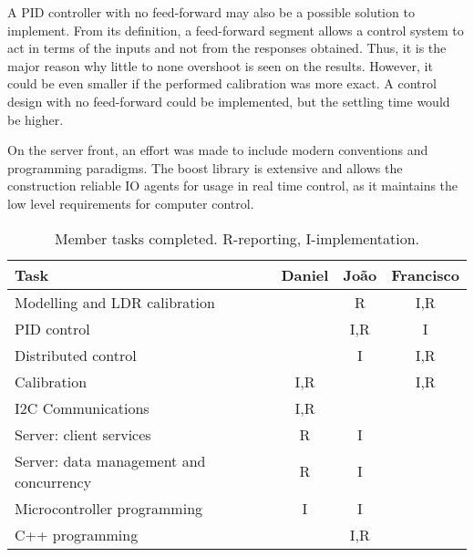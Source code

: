 \documentclass[english,fira]{ist-report}
\begin{document}

A PID controller with no feed-forward may also be a possible solution to implement. From its definition, a feed-forward segment allows a control system to act in terms of the inputs and not from the responses obtained. Thus, it is the major reason why little to none overshoot is seen on the results. However, it could be even smaller if the performed calibration was more exact. A control design with no feed-forward could be implemented, but the settling time would be higher.

On the server front, an effort was made to include modern conventions and programming paradigms. The boost library is extensive and allows the construction reliable IO agents for usage in real time control, as it maintains the low level requirements for computer control. 

\nocite{consensusbernardino}
\printbibliography[heading = bibnumbered]

\begin{table}[H]
    \centering
    \begin{tabular}{l|c|c|c}
        \toprule
        \textbf{Task}                                     & \textbf{Daniel} & \textbf{João} & \textbf{Francisco} \\
        \midrule
        Modelling and LDR calibration            &        &   R  &      I,R  \\
        \hline
        PID control                              &        &  I,R &      I    \\
        \hline
        Distributed control                      &        &   I  &      I,R  \\
        \hline
        Calibration                              &  I,R   &      &      I,R  \\
        \hline
        I2C Communications                       &  I,R   &      &           \\
        \hline
        Server: client services                  &  R     &   I  &           \\
        \hline
        Server: data management and concurrency  &  R     &   I  &           \\
        \hline
        Microcontroller programming              &  I     &   I  &           \\
        \hline
        C++ programming                          &        & I,R  &           \\
        \bottomrule
    \end{tabular}
    \caption{Member tasks completed. R-reporting, I-implementation.}
    \label{tab:my_label}
\end{table}
\end{document}
